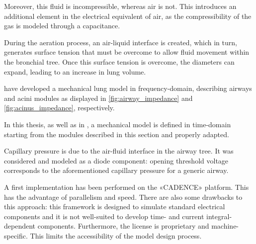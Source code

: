Moreover, this fluid is incompressible, whereas air is not. This
introduces an additional element in the electrical equivalent of air,
as the compressibility of the gas is modeled through a
capacitance.


During the aeration process, an air-liquid interface is created, which
in turn, generates surface tension that must be overcome to allow fluid
movement within the bronchial tree. Once this surface tension is
overcome, the diameters can expand, leading to an increase in lung
volume.

\textcite{lutchen1997} have developed a mechanical lung model in
frequency-domain, describing airways and acini modules as displayed
in \cref{fig:airway_impedance} and \cref{fig:acinus_impedance},
respectively.




In this thesis, as well as in \cite{mani2020}, a mechanical model is
defined in time-domain starting from the modules described in this
section and properly adapted.




Capillary pressure is due to the air-fluid interface in the airway tree.
It was considered and modeled as a diode component: opening
threshold voltage corresponds to the aforementioned capillary
pressure for a generic airway.

A first implementation has been performed on the «CADENCE» platform.  This
has the advantage of parallelism and speed.  There are also some
drawbacks to this approach: this framework is designed to simulate
standard electrical components and it is not well-suited to develop
time- and current integral-dependent components.  Furthermore, the license
is proprietary and machine-specific.  This limits the accessibility
of the model design process.


